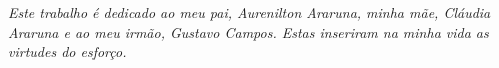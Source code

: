 \begin{dedicatoria}
   \vspace*{\fill}
   \centering
   \noindent

   \textit{Este trabalho é dedicado ao meu pai, Aurenilton Araruna, minha mãe, Cláudia Araruna e ao meu irmão, Gustavo Campos. Estas inseriram na minha vida as virtudes do esforço.} \vspace*{\fill}
\end{dedicatoria}
